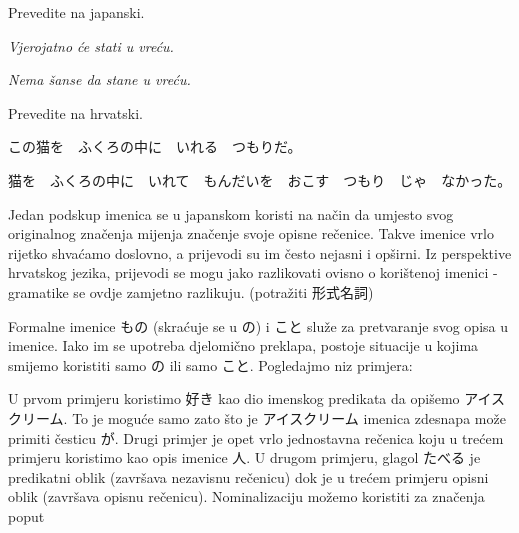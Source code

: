 	\begin{mondai}{Prevedite na japanski.}
		\item \textit{Vjerojatno će stati u vreću.}
		\item \textit{Nema šanse da stane u vreću.}
	\end{mondai}

	\begin{mondai}{Prevedite na hrvatski.}
		\item この猫を　ふくろの中に　いれる　つもりだ。
		\item 猫を　ふくろの中に　いれて　もんだいを　おこす　つもり　じゃ　なかった。
	\end{mondai}
\newpage
{}

	
	
	Jedan podskup imenica se u japanskom koristi na način da umjesto svog originalnog značenja mijenja značenje svoje opisne rečenice. Takve imenice vrlo rijetko shvaćamo doslovno, a prijevodi su im često nejasni i opširni. Iz perspektive hrvatskog jezika, prijevodi se mogu jako razlikovati ovisno o korištenoj imenici - gramatike se ovdje zamjetno razlikuju. (potražiti 形式名詞)
	
	
	
	Formalne imenice もの (skraćuje se u の) i こと služe za pretvaranje svog opisa u imenice. Iako im se upotreba djelomično preklapa, postoje situacije u kojima smijemo koristiti samo の ili samo こと. Pogledajmo niz primjera:
	
	\begin{reibun}
	\end{reibun}
	
	U prvom primjeru koristimo 好き kao dio imenskog predikata da opišemo アイスクリーム. To je moguće samo zato što je アイスクリーム imenica zdesna\footnotemark[1] pa može primiti česticu が. Drugi primjer je opet vrlo jednostavna rečenica koju u trećem primjeru koristimo kao opis imenice 人. U drugom primjeru, glagol たべる je predikatni oblik (završava nezavisnu rečenicu) dok je u trećem primjeru opisni oblik (završava opisnu rečenicu)\footnotemark[2]. Nominalizaciju možemo koristiti za značenja poput
	
